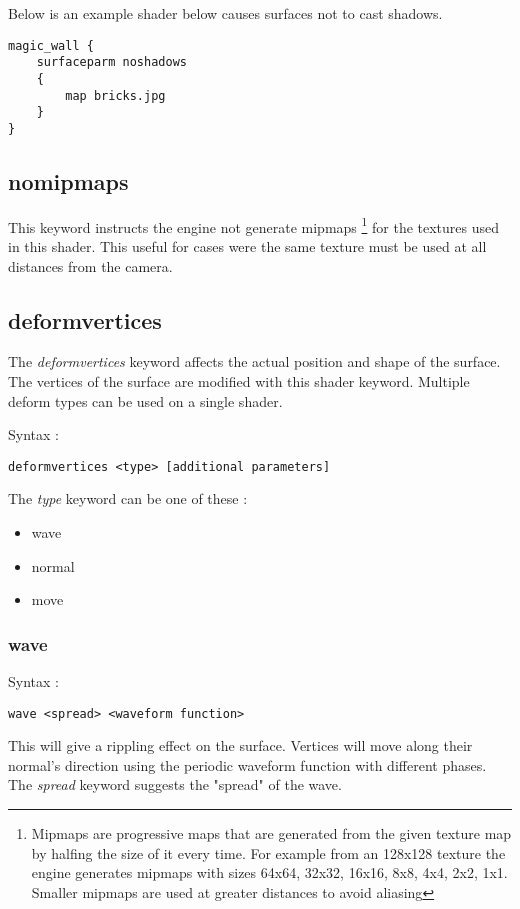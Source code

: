 \documentclass[12pt, titlepage]{amsart}
\begin{document}
Below is an example shader below causes surfaces not to cast shadows.

\begin{verbatim}
magic_wall {
    surfaceparm noshadows
    {
        map bricks.jpg
    }
}
\end{verbatim}

\subsection{nomipmaps}
This keyword instructs the engine not generate mipmaps
\footnote{Mipmaps are progressive maps that are generated from the given
texture map by halfing the size of it every time. For example from an
128x128 texture the engine generates mipmaps with sizes 64x64, 32x32,
16x16, 8x8, 4x4, 2x2, 1x1. Smaller mipmaps are used at greater distances
to avoid aliasing}
for the textures used in this shader. This useful for cases were the
same texture must be used at all distances from the camera.

\subsection{deformvertices}
The \textit{deformvertices} keyword affects the actual position and shape of the surface.
The vertices of the surface are modified with this shader keyword. Multiple
deform types can be used on a single shader.

Syntax :
\begin{verbatim}
deformvertices <type> [additional parameters]
\end{verbatim}

The \textit{type} keyword can be one of these :

\begin{itemize}
\item wave
\item normal
\item move
\end{itemize}

\subsubsection{wave}
Syntax :
\begin{verbatim}
wave <spread> <waveform function>
\end{verbatim}

This will give a rippling effect on the surface. Vertices will move along their normal's
direction using the periodic waveform function with different phases. The \textit{spread}
keyword suggests the "spread" of the wave.
\end{document}
